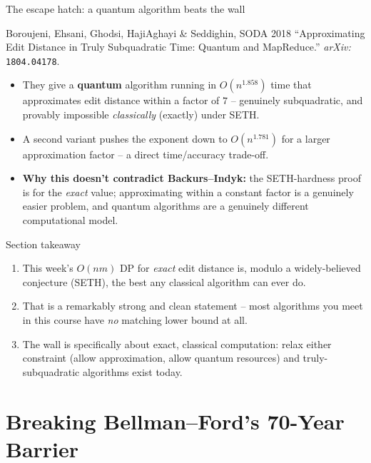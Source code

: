 \documentclass[11pt,aspectratio=169]{beamer}
\begin{document}
\begin{frame}{The escape hatch: a quantum algorithm beats the wall}
  \begin{block}{Boroujeni, Ehsani, Ghodsi, HajiAghayi \& Seddighin, SODA 2018}
    ``Approximating Edit Distance in Truly Subquadratic Time: Quantum and MapReduce.''
    \emph{arXiv:} \texttt{1804.04178}.
  \end{block}
  \begin{itemize}
    \item They give a \textbf{quantum} algorithm running in $O(n^{1.858})$ time that
    approximates edit distance within a factor of $7$ -- genuinely subquadratic, and
    provably impossible \emph{classically} (exactly) under SETH.
    \item A second variant pushes the exponent down to $O(n^{1.781})$ for a larger
    approximation factor -- a direct time/accuracy trade-off.
    \item \textbf{Why this doesn't contradict Backurs--Indyk:} the SETH-hardness proof is
    for the \emph{exact} value; approximating within a constant factor is a
    genuinely easier problem, and quantum algorithms are a genuinely different
    computational model.
  \end{itemize}
\end{frame}

\begin{frame}{Section takeaway}
  \begin{enumerate}
    \item This week's $O(nm)$ DP for \emph{exact} edit distance is, modulo a
    widely-believed conjecture (SETH), the best any classical algorithm can ever do.
    \item That is a remarkably strong and clean statement -- most algorithms you meet in
    this course have \emph{no} matching lower bound at all.
    \item The wall is specifically about exact, classical computation: relax either
    constraint (allow approximation, allow quantum resources) and truly-subquadratic
    algorithms exist today.
  \end{enumerate}
\end{frame}

\section{Breaking Bellman--Ford's 70-Year Barrier}
\end{document}
